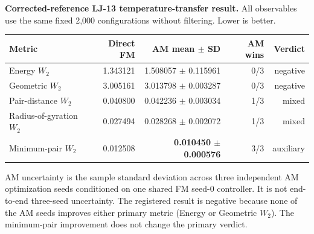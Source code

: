 \documentclass[10pt]{article}
\begin{document}
\small
\textbf{Corrected-reference LJ-13 temperature-transfer result.}
All observables use the same fixed 2,000 configurations without filtering.
Lower is better.

\vspace{0.9em}
\begin{center}
\begin{tabular}{lrrrr}
\toprule
Metric & Direct FM & AM mean $\pm$ SD & AM wins & Verdict \\
\midrule
Energy $W_2$ & 1.343121 & 1.508057 $\pm$ 0.115961 & 0/3 & negative \\
Geometric $W_2$ & 3.005161 & 3.013798 $\pm$ 0.003287 & 0/3 & negative \\
Pair-distance $W_2$ & 0.040800 & 0.042236 $\pm$ 0.003034 & 1/3 & mixed \\
Radius-of-gyration $W_2$ & 0.027494 & 0.028268 $\pm$ 0.002072 & 1/3 & mixed \\
Minimum-pair $W_2$ & 0.012508 & \textbf{0.010450 $\pm$ 0.000576} & 3/3 & auxiliary \\
\bottomrule
\end{tabular}
\end{center}

\vspace{0.45em}
\footnotesize
AM uncertainty is the sample standard deviation across three independent AM
optimization seeds conditioned on one shared FM seed-0 controller.  It is not
end-to-end three-seed uncertainty.  The registered result is negative because
none of the AM seeds improves either primary metric (Energy or Geometric
$W_2$).  The minimum-pair improvement does not change the primary verdict.
\end{document}

